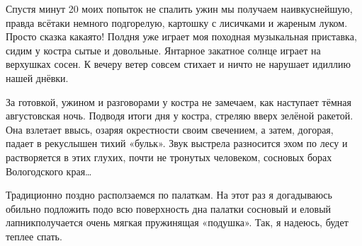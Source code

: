 Спустя минут 20 моих попыток не спалить ужин мы получаем наивкуснейшую, правда всё\sdash таки немного подгорелую, картошку с лисичками и жареным луком.  Просто сказка какая\sdash то! Полдня уже играет моя походная музыкальная приставка, сидим у костра сытые и довольные. Янтарное закатное солнце играет на верхушках сосен. К вечеру ветер совсем стихает и ничто не нарушает идиллию нашей днёвки.

За готовкой, ужином и разговорами у костра не замечаем, как наступает тёмная августовская ночь. Подводя итоги дня у костра, стреляю вверх зелёной ракетой. Она взлетает ввысь, озаряя окрестности своим свечением, а затем, догорая, падает в реку\mdash слышен тихий «бульк». Звук выстрела разносится эхом по лесу и растворяется в этих глухих, почти не тронутых человеком, сосновых борах Вологодского края\ldots~

Традиционно поздно расползаемся по палаткам. На этот раз я догадываюсь обильно подложить подо всю поверхность дна палатки сосновый и еловый лапник\mdash получается очень мягкая пружинящая «подушка». Так, я надеюсь, будет теплее спать. 

\begin{center}
\end{center}